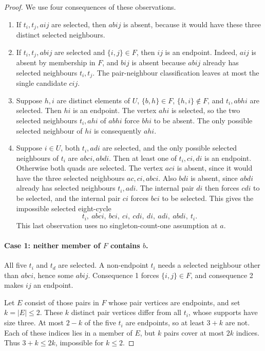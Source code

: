 \documentclass[11pt,a4paper]{article}
\theoremstyle{definition}
\theoremstyle{remark}
\begin{document}
\begin{proof}
We use four consequences of these observations.
\begin{enumerate}
\item If $t_i,t_j,aij$ are selected, then $abij$ is absent, because it would have these three distinct selected neighbours.
\item If $t_i,t_j,abij$ are selected and $\{i,j\}\in F$, then $ij$ is an endpoint. Indeed, $aij$ is absent by membership in $F$, and $bij$ is absent because $abij$ already has selected neighbours $t_i,t_j$. The pair-neighbour classification leaves at most the single candidate $cij$.
\item Suppose $h,i$ are distinct elements of $U$, $\{b,h\}\in F$, $\{h,i\}\notin F$, and $t_i,abhi$ are selected. Then $hi$ is an endpoint. The vertex $ahi$ is selected, so the two selected neighbours $t_i,ahi$ of $abhi$ force $bhi$ to be absent. The only possible selected neighbour of $hi$ is consequently $ahi$.
\item Suppose $i\in U$, both $t_i,adi$ are selected, and the only possible selected neighbours of $t_i$ are $abci,abdi$. Then at least one of $t_i,ci,di$ is an endpoint. Otherwise both quads are selected. The vertex $aci$ is absent, since it would have the three selected neighbours $ac,ci,abci$. Also $bdi$ is absent, since $abdi$ already has selected neighbours $t_i,adi$. The internal pair $di$ then forces $cdi$ to be selected, and the internal pair $ci$ forces $bci$ to be selected. This gives the impossible selected eight-cycle
\[
t_i,\ abci,\ bci,\ ci,\ cdi,\ di,\ adi,\ abdi,\ t_i.
\]
This last observation uses no singleton-count-one assumption at $a$.
\end{enumerate}

\paragraph{Case 1: neither member of $F$ contains $b$.}
All five $t_i$ and $t_d$ are selected. A non-endpoint $t_i$ needs a selected neighbour other than $abci$, hence some $abij$. Consequence 1 forces $\{i,j\}\in F$, and consequence 2 makes $ij$ an endpoint.

Let $E$ consist of those pairs in $F$ whose pair vertices are endpoints, and set $k=|E|\le2$. These $k$ distinct pair vertices differ from all $t_i$, whose supports have size three. At most $2-k$ of the five $t_i$ are endpoints, so at least $3+k$ are not. Each of these indices lies in a member of $E$, but $k$ pairs cover at most $2k$ indices. Thus $3+k\le2k$, impossible for $k\le2$.


\end{proof}
\end{document}
